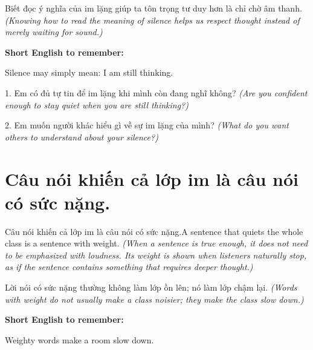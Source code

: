 \begin{baihoc}
Biết đọc ý nghĩa của im lặng giúp ta tôn trọng tư duy hơn là chỉ chờ âm thanh.
\textit{(Knowing how to read the meaning of silence helps us respect thought instead of merely waiting for sound.)}
\end{baihoc}

\begin{ghinhoanh}
\textbf{Short English to remember:}

Silence may simply mean: I am still thinking.

\end{ghinhoanh}

\begin{tuhocnhanh}
1. Em có đủ tự tin để im lặng khi mình còn đang nghĩ không? \textit{(Are you confident enough to stay quiet when you are still thinking?)}

2. Em muốn người khác hiểu gì về sự im lặng của mình? \textit{(What do you want others to understand about your silence?)}
\end{tuhocnhanh}
\ngancach


\section{Câu nói khiến cả lớp im là câu nói có sức nặng.}
\begin{truyen}{Câu nói khiến cả lớp im là câu nói có sức nặng.}{A sentence that quiets the whole class is a sentence with weight.}
\textit{(When a sentence is true enough, it does not need to be emphasized with loudness. Its weight is shown when listeners naturally stop, as if the sentence contains something that requires deeper thought.)}
\end{truyen}

\begin{baihoc}
Lời nói có sức nặng thường không làm lớp ồn lên; nó làm lớp chậm lại.
\textit{(Words with weight do not usually make a class noisier; they make the class slow down.)}
\end{baihoc}

\begin{ghinhoanh}
\textbf{Short English to remember:}

Weighty words make a room slow down.

\end{ghinhoanh}

